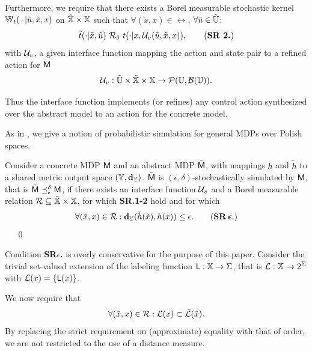 \documentclass{ifacconf}
\begin{document}
Furthermore, we require that there exists a Borel measurable stochastic kernel $\mathbb{W}_{t}(\,\cdot\,{\mid} \tilde u,\tilde x,x)$ on $\tilde {{\mathbb{X}}}\times{\mathbb{X}}$ such that $\forall (\tilde x,x)\in \rel$, $\forall \tilde u\in\tilde {{\mathbb{U}}}$:
\begin{equation}\tilde \tr(\cdot| \tilde x, \tilde u)\ \bar \rel_\delta \  \tr(\cdot| x, \InF(\tilde u,\tilde x,x)),\tag{\textbf{SR 2.}}\end{equation} with $\mathcal{U}_{v}$, a given interface function mapping the action and state pair to a refined action for $\mathsf{M}$
\begin{align*}\mathcal{U}_{v}: \tilde {{\mathbb{U}}}\times \tilde {{\mathbb{X}}}\times{\mathbb{X}} \rightarrow \mathcal{P}({\mathbb{U}},\mathcal B({\mathbb{U}})). \end{align*}

Thus the interface function implements (or refines) any control action synthesized over the abstract model to an action for the concrete model.


As in \citep{haesaert2017verification},  we give a notion of probabilistic simulation for  general MDPs over Polish spaces.
%
\begin{definition}\label{def:apbsim}
Consider a concrete MDP $\mathsf{M}$ and an abstract  MDP $\tilde{\mathsf{M}}$, with mappings $h$ and  $\tilde h$  to a shared {metric} output space  $({\mathbb{Y}},\mathbf{d}_{\mathbb{Y}})$.   
	$\tilde{\mathsf{M}}$ is $(\epsilon,\delta)$-stochastically simulated by $\mathsf{M}$, that is $\tilde{\mathsf{M}}\preceq^{\delta}_\epsilon\mathsf{M}$,  if there exists an interface function $\mathcal{U}_{v}$ and
	a Borel measurable relation $\mathcal{R}\subseteq \tilde {{\mathbb{X}}}\times {\mathbb{X}}$, for which \textbf{SR.1-2} hold and for which 
	\begin{equation}
		\forall (\tilde x,x)\in \rel:\mathbf{d}_\Y(\tilde h(\tilde x),h(x))  \leq \epsilon.\tag{\textbf{SR\,$\boldsymbol{\epsilon}$}.}
	\end{equation} 
\mbox{ }	\hfill\mbox{ }\qed
\end{definition}
Condition \textbf{SR$\epsilon$.} is overly conservative for the purpose of this paper. 
Consider the trivial set-valued extension of  the labeling function $\mathsf{L}:{\mathbb{X}}\rightarrow\Sigma$, that is  $\mathcal{L}:{\mathbb{X}}\rightarrow2^\Sigma$ with
 $\mathcal{L}(x)=\{\mathsf{L}(x)\}$.

 
We now require that \begin{equation}
  \forall (\tilde x,x )\in \mathcal{R}:  \mathcal{L}(x)\subset \tilde{\mathcal{L}}(\tilde x).
  \end{equation} 
By replacing the strict requirement on (approximate) equality with that of order,   we are not restricted to the use of a distance measure. %
 
\end{document}

